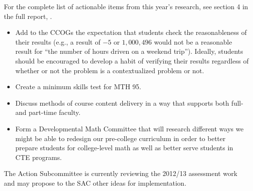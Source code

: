 \begin{description}
For the complete list of actionable items from this year's research, see section
4 in the full report, \cite{annualLASreport2012}. 

\begin{itemize}
\item Add to the CCOGs the expectation that students check the reasonableness of
  their results (e.g., a result of $-5$ or $1{,}000{,}496$ would not be a
  reasonable result for ``the number of hours driven on a weekend trip'').
  Ideally, students should be encouraged to develop a habit of verifying their
  results regardless of whether or not the problem is a contextualized problem
  or not.
\item Create a minimum skills test for MTH 95.
\item Discuss methods of course content delivery in a way that supports both
  full- and part-time faculty.
\item Form a Developmental Math Committee that will research different ways we
  might be able to redesign our pre-college curriculum in order to better
  prepare students for college-level math as well as better serve students in
  CTE programs.
\end{itemize}

\end{description}

The Action Subcommittee is currently reviewing the 2012/13 assessment work and
may propose to the SAC other ideas for implementation.
